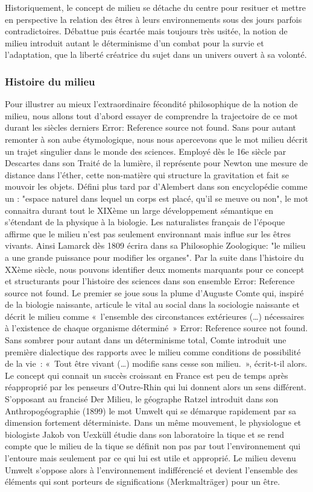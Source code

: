 Historiquement, le concept de milieu se détache du centre pour resituer et mettre en perspective la relation des êtres à leurs environnements sous des jours parfois contradictoires. Débattue puis écartée mais toujours très usitée, la notion de milieu introduit autant le déterminisme d’un combat pour la survie et l’adaptation, que la liberté créatrice du sujet dans un univers ouvert à sa volonté. 

\subsubsection[Histoire du milieu]{Histoire du milieu}
Pour illustrer au mieux l’extraordinaire fécondité philosophique de la notion de milieu, nous allons tout d’abord essayer de comprendre la trajectoire de ce mot durant les siècles derniers Error: Reference source not found. Sans pour autant remonter à son aube étymologique, nous nous apercevons que le mot milieu décrit un trajet singulier dans le monde des sciences. Employé dès le 16e siècle par Descartes dans son Traité de la lumière, il représente pour Newton une mesure de distance dans l’éther, cette non-matière qui structure la gravitation et fait se mouvoir les objets. Défini plus tard par d'Alembert dans son encyclopédie comme un : "espace naturel dans lequel un corps est placé, qu'il se meuve ou non", le mot connaitra durant tout le XIXème un large développement sémantique en s'étendant de la physique à la biologie. Les naturalistes français de l’époque affirme que le milieu n’est pas seulement environnant mais influe sur les êtres vivants. Ainsi Lamarck dès 1809 écrira dans sa Philosophie Zoologique: "le milieu a une grande puissance pour modifier les organes". Par la suite dans l’histoire du XXème siècle, nous pouvons identifier deux moments marquants pour ce concept et structurants pour l’histoire des sciences dans son ensemble Error: Reference source not found. 
Le premier se joue sous la plume d’Auguste Comte qui, inspiré de la biologie naissante, articule le vital au social dans la sociologie naissante et décrit le milieu comme « l’ensemble des circonstances extérieures (…) nécessaires à l’existence de chaque organisme déterminé » Error: Reference source not found. Sans sombrer pour autant dans un déterminisme total, Comte introduit une première dialectique des rapports avec le milieu comme conditions de possibilité de la vie : « Tout être vivant (…) modifie sans cesse son milieu. », écrit-t-il alors. 
Le concept qui connait un succès croissant en France est peu de temps après réapproprié par les penseurs d’Outre-Rhin qui lui donnent alors un sens différent. S’opposant au francisé Der Milieu, le géographe Ratzel introduit dans son Anthropogéographie (1899) le mot Umwelt qui se démarque rapidement par sa dimension fortement déterministe. Dans un même mouvement, le physiologue et biologiste Jakob von Uexküll étudie dans son laboratoire la tique et se rend compte que le milieu de la tique se définit non pas par tout l’environnement qui l’entoure mais seulement par ce qui lui est utile et approprié. Le milieu devenu Umwelt s’oppose alors à l’environnement indifférencié et devient l’ensemble des éléments qui sont porteurs de significations (Merkmalträger) pour un être. 

